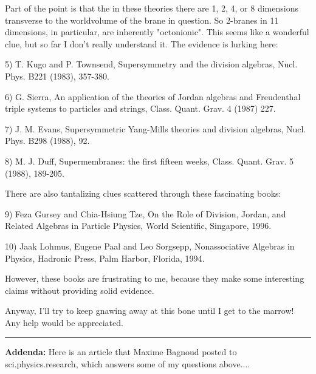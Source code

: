Part of the point is that the in these theories there are 1, 2, 4, 
or 8 dimensions transverse to the worldvolume of the brane in question.
So 2-branes in 11 dimensions, in particular, are inherently "octonionic". 
This seems like a wonderful clue, but so far I don't really understand it.   
The evidence is lurking here: 
 
5) T. Kugo and P. Townsend, Supersymmetry and the division algebras, 
Nucl. Phys. B221 (1983), 357-380. 
 
6) G. Sierra, An application of the theories of Jordan algebras and 
Freudenthal triple systems to particles and strings, Class. Quant.  
Grav. 4 (1987) 227. 
 
7) J. M. Evans, Supersymmetric Yang-Mills theories and division algebras, 
Nucl. Phys. B298 (1988), 92. 
 
8) M. J. Duff, Supermembranes: the first fifteen weeks, Class. Quant. 
Grav. 5 (1988), 189-205. 
 
There are also tantalizing clues scattered through these fascinating 
books: 
 
9) Feza Gursey and Chia-Hsiung Tze, On the Role of Division, Jordan, and 
Related Algebras in Particle Physics, World Scientific, Singapore, 1996. 
 
10) Jaak Lohmus, Eugene Paal and Leo Sorgsepp, Nonassociative Algebras 
in Physics, Hadronic Press, Palm Harbor, Florida, 1994. 
 
However, these books are frustrating to me, because they make some 
interesting claims without providing solid evidence.   
 
Anyway, I'll try to keep gnawing away at this bone until I get to the 
marrow!   Any help would be appreciated.
 

\par\noindent\rule{\textwidth}{0.4pt}
\textbf{Addenda:}
Here is an article that Maxime Bagnoud posted to sci.physics.research,
which answers some of my questions above....

